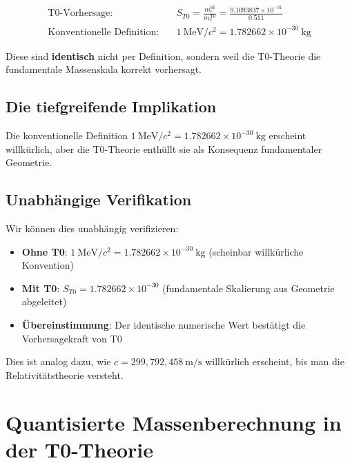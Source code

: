 	\begin{align}
		\text{T0-Vorhersage:} \quad & S_{T0} = \frac{m_e^{\mathrm{SI}}}{m_e^{\mathrm{T0}}} = \frac{9.1093837 \times 10^{-31}}{0.511} \\
		\text{Konventionelle Definition:} \quad & 1~\mathrm{MeV}/c^2 = 1.782662 \times 10^{-30}~\mathrm{kg}
	\end{align}
	
	Diese sind \textbf{identisch} nicht per Definition, sondern weil die T0-Theorie die fundamentale Massenskala korrekt vorhersagt.
	
	\subsection{Die tiefgreifende Implikation}
	
	\begin{center}
	\end{center}
	
	Die konventionelle Definition $1~\mathrm{MeV}/c^2 = 1.782662 \times 10^{-30}~\mathrm{kg}$ erscheint willkürlich, aber die T0-Theorie enthüllt sie als Konsequenz fundamentaler Geometrie.
	
	\subsection{Unabhängige Verifikation}
	
	Wir können dies unabhängig verifizieren:
	
	\begin{itemize}
		\item \textbf{Ohne T0}: $1~\mathrm{MeV}/c^2 = 1.782662\times 10^{-30}~\mathrm{kg}$ (scheinbar willkürliche Konvention)
		\item \textbf{Mit T0}: $S_{T0} = 1.782662\times 10^{-30}$ (fundamentale Skalierung aus Geometrie abgeleitet)
		\item \textbf{Übereinstimmung}: Der identische numerische Wert bestätigt die Vorhersagekraft von T0
	\end{itemize}
	
	Dies ist analog dazu, wie $c = 299,792,458~\mathrm{m/s}$ willkürlich erscheint, bis man die Relativitätstheorie versteht.
	
	\section{Quantisierte Massenberechnung in der T0-Theorie}
	
